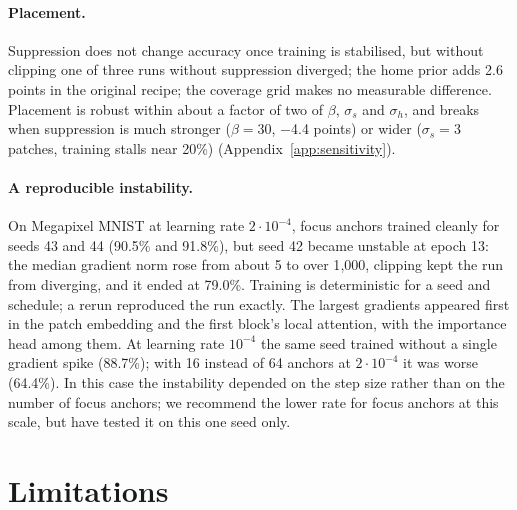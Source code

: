 \documentclass[10pt]{article}
\begin{document}
\paragraph{Placement.} Suppression does not change accuracy once training is stabilised, but
without clipping one of three runs without suppression diverged; the home prior adds 2.6 points
in the original recipe; the coverage grid makes no measurable difference. Placement is robust
within about a factor of two of $\beta$, $\sigma_s$ and $\sigma_h$, and breaks when suppression
is much stronger ($\beta=30$, $-$4.4 points) or wider ($\sigma_s=3$ patches, training stalls near
20\%) (Appendix~\ref{app:sensitivity}).

\paragraph{A reproducible instability.} On Megapixel MNIST at learning rate $2\cdot10^{-4}$, focus
anchors trained cleanly for seeds 43 and 44 (90.5\% and 91.8\%), but seed 42 became unstable at
epoch 13: the median gradient norm rose from about 5 to over 1{,}000, clipping kept the run from
diverging, and it ended at 79.0\%. Training is deterministic for a seed and schedule; a rerun
reproduced the run exactly. The largest gradients appeared first in the patch embedding and the
first block's local attention, with the importance head among them. At learning rate
$10^{-4}$ the same seed trained without a single gradient spike (88.7\%); with 16 instead of 64
anchors at $2\cdot10^{-4}$ it was worse (64.4\%). In this case the instability depended on the
step size rather than on the number of focus anchors; we recommend the lower rate for focus
anchors at this scale, but have tested it on this one seed only.

\section{Limitations}
\end{document}
